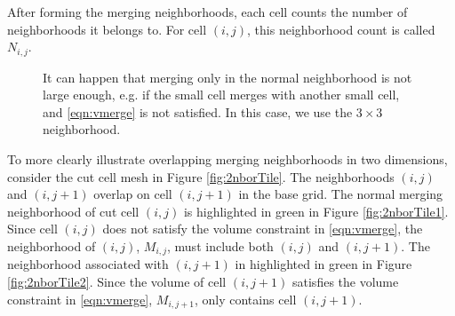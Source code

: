 After forming the merging neighborhoods, each cell counts the number of neighborhoods it belongs to.
For cell $(i,j)$, this neighborhood count is called $N_{i,j}$.

\begin{figure}[h]
\hspace*{.5in}
	\hfill
	\caption{\sf It can happen that merging only in the normal neighborhood is not 
        large enough, e.g. if the small cell merges with another small cell, and \eqref{eqn:vmerge} is not satisfied.  In this case, we use the $3\times 3$ neighborhood. }
\end{figure}


To more clearly illustrate overlapping merging neighborhoods in two dimensions, consider the cut cell 
mesh in Figure \ref{fig:2nborTile}.   The neighborhoods $(i,j)$ and $(i,j+1)$ overlap on cell $(i,j+1)$ in 
the base grid.  The normal merging neighborhood of cut cell $(i,j)$ is highlighted in green in Figure \ref{fig:2nborTile1}.  
Since cell $(i,j)$ does not satisfy the volume constraint in \eqref{eqn:vmerge},
the neighborhood of $(i,j)$, $M_{i,j}$, must include both $(i,j)$ and $(i,j+1)$.  
The neighborhood associated with $(i,j+1)$ in highlighted in green in Figure \ref{fig:2nborTile2}.  
Since the volume of cell $(i,j+1)$ satisfies the volume constraint in \eqref{eqn:vmerge}, $M_{i,j+1}$, only contains cell $(i,j+1)$.
  
